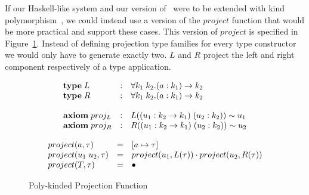 If our Haskell-like system and our version of \systemfc~were to be extended
with kind polymorphism~\cite{yorgey}, we could instead use a version of the
$project$ function that would be more practical and support these cases. This
version of $project$ is specified in Figure~\ref{fig:poly-project}. Instead of
defining projection type families for every type constructor we would only have
to generate exactly two. $L$ and $R$ project the left and right component
respectively of a type application.

\[
\begin{array}{l c l}
    \textbf{type} \; L &: &\forall k_1 \; k_2. (a : k_1) \rightarrow k_2
    \\
    \textbf{type} \; R &: &\forall k_1 \; k_2. (a : k_1) \rightarrow k_2
    \\
    \\
    \textbf{axiom} \; proj_L &:& L((u_1 : k_2 \rightarrow k_1) \; (u_2 : k_2))
    \sim u_1
    \\
    \textbf{axiom} \; proj_R &:& R((u_1 : k_2 \rightarrow k_1) \; (u_2 : k_2))
    \sim u_2
\end{array}
\]
\begin{figure}
\[
\begin{array}{l c l}

    project(a, \tau) & = & [a \mapsto \tau]
    \\
    project(u_1 \; u_2, \tau) & = &
    project(u_1, L(\tau)) \cdot project(u_2, R(\tau))
    \\
    project(T, \tau) & = & \bullet
\end{array}
\]
\caption{Poly-kinded Projection Function}
\label{fig:poly-project}
\end{figure}
